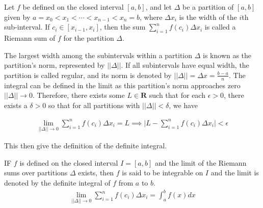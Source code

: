 \begin{defn}[Riemann Sum\label{defn:Riemann Sum]{1}
Let $f$ be defined on the closed interval $[a,b]$, and let $\Delta$ be a partition of $[a,b]$ given by $a=x_0 < x_1 < \cdots < x_{n-1} < x_n = b$, where $\Delta x_i$ is the width of the $i$th sub-interval. If $c_i \in [x_{i-1},x_i]$, then the sum $\sum_{i=1}^{n}f(c_i)\Delta x_i$ is called a Riemann sum of $f$ for the partition $\Delta$.
\end{defn}

The largest width among the subintervals within a partition $\Delta$ is known as the partition's norm, represented by $||\Delta||$. If all subintervals have equal width, the partition is called regular, and its norm is denoted by $||\Delta|| = \Delta x = \frac{b-a}{n}$. The integral can be defined in the limit as this partition's norm approaches zero $||\Delta|| \to 0$. Therefore, there exists some $L\in\mathbf{R}$ such that for each $\epsilon > 0$, there exists a $\delta > 0$ so that for all partitions with $||\Delta|| < \delta$, we have

\begin{align}
\lim_{||\Delta|| \to 0}\sum_{i=1}^{n}f(c_i)\Delta x_i = L \implies \bigg|L-\sum_{i=1}^{n}f(c_i)\Delta x_i\bigg| < \epsilon
\end{align}

This then give the definition of the definite integral.

\begin{defn}{1}
IF $f$ is defined on the closed interval $I=[a,b]$ and the limit of the Riemann sums over partitions $\Delta$ exists, then $f$ is said to be integrable on $I$ and the limit is denoted by the definite integral of $f$ from $a$ to $b$. 
\begin{align}
\lim_{||\Delta|| \to 0}\sum_{i=1}^{n}f(c_i)\Delta x_i = \int_a^b f(x)dx
\end{align}
\end{defn}

